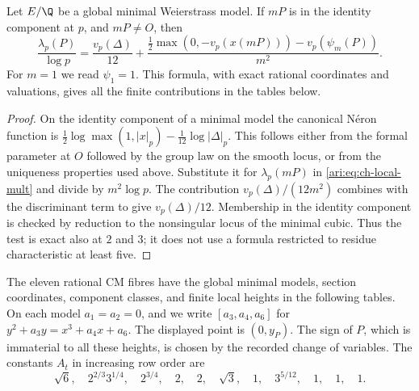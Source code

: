 \begin{proposition}\label{ari:C.6.2}
Let $E/\Q$ be a global minimal Weierstrass model. If $mP$ is
in the identity component at $p$, and $mP\ne O$, then
\begin{equation}\label{ari:eq:ch-local-exact}
 \frac{\lambda_p(P)}{\log p}
 =\frac{v_p(\Delta)}{12}
   +\frac{\frac12\max(0,-v_p(x(mP)))-v_p(\psi_m(P))}{m^2}.
\end{equation}
For $m=1$ we read $\psi_1=1$. This formula, with exact rational
coordinates and valuations, gives all the finite contributions
in the tables below.
\end{proposition}

\begin{proof}
On the identity component of a minimal model the canonical
N\'eron function is
$\frac12\log\max(1,|x|_p)-\frac1{12}\log|\Delta|_p$.
This follows either from the formal parameter at $O$ followed
by the group law on the smooth locus, or from the uniqueness
properties used above. Substitute it for $\lambda_p(mP)$ in
\eqref{ari:eq:ch-local-mult} and divide by $m^2\log p$.
The contribution $v_p(\Delta)/(12m^2)$ combines with the
discriminant term to give $v_p(\Delta)/12$.
Membership in the identity component is checked by reduction
to the nonsingular locus of the minimal cubic. Thus the test is
exact also at $2$ and $3$; it does not use a formula restricted
to residue characteristic at least five.
\end{proof}

\begin{proposition}\label{ari:C.6.3}
The eleven rational CM fibres have the global minimal models,
section coordinates, component classes, and finite local heights
in the following tables. On each model $a_1=a_2=0$, and we
write $[a_3,a_4,a_6]$ for
$y^2+a_3y=x^3+a_4x+a_6$. The displayed point is $(0,y_P)$.
The sign of $P$, which is immaterial to all these heights,
is chosen by the recorded change of variables.
The constants $A_t$ in increasing row order are
\[
 \sqrt6,\quad 2^{2/3}3^{1/4},\quad 2^{3/4},\quad
 2,\quad 2,\quad \sqrt3,\quad 1,\quad 3^{5/12},\quad
 1,\quad1,\quad1.
\]
\end{proposition}

